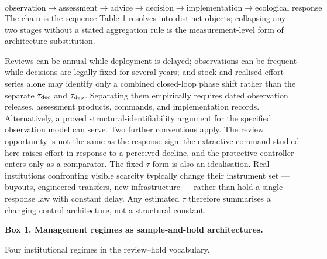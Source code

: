 \documentclass[11pt]{article}
\begin{document}
\[ \text{observation} \to \text{assessment} \to \text{advice} \to \text{decision} \to \text{implementation} \to \text{ecological response} \] The chain is the sequence Table 1 resolves into distinct objects; collapsing any two stages without a stated aggregation rule is the measurement-level form of architecture substitution.

Reviews can be annual while deployment
is delayed; observations can be frequent while decisions are legally
fixed for several years; and stock and realised-effort series alone may
identify only a combined closed-loop phase shift rather than the
separate \(\tau_{\rm dec}\) and \(\tau_{\rm dep}\). Separating them
empirically requires dated observation releases, assessment products,
commands, and implementation records. Alternatively, a proved
structural-identifiability argument for the specified observation model
can serve. Two further conventions apply. The review
opportunity is not the same as the response sign: the extractive command
studied here raises effort in response to a perceived decline, and the
protective controller enters only as a comparator. The fixed-\(\tau\)
form is also an idealisation. Real institutions confronting visible
scarcity typically change their instrument set --- buyouts, engineered
transfers, new infrastructure --- rather than hold a single response law
with constant delay. Any estimated \(\tau\) therefore summarises a
changing control architecture, not a structural constant.

\textbf{Box 1. Management regimes as sample-and-hold architectures.}

Four institutional regimes in the review--hold vocabulary.
\end{document}
